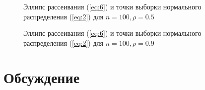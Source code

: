 \documentclass{article}
\begin{document}
\begin{figure}[h]
\caption{Эллипс рассеивания (\ref{eq:6}) и точки выборки нормального распределения (\ref{eq:2}) для $n = 100, \rho = 0.5$}
\end{figure}

\begin{figure}[h]
\caption{Эллипс рассеивания (\ref{eq:6}) и точки выборки нормального распределения (\ref{eq:2})  для $n = 100, \rho = 0.9$}
\end{figure}

\newpage
\section{Обсуждение}
\end{document}
